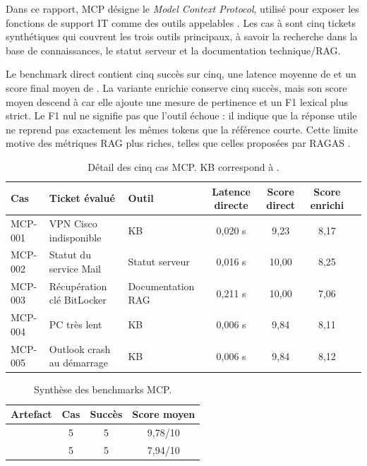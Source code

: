 Dans ce rapport, MCP désigne le \emph{Model Context Protocol}, utilisé pour
exposer les fonctions de support IT comme des outils appelables \cite{mcp2024}.
Les cas
 à  sont cinq
tickets synthétiques qui couvrent les trois outils principaux, à savoir la
recherche dans la base de connaissances, le statut serveur et la documentation
technique/RAG.

Le benchmark direct contient cinq succès sur cinq, une latence moyenne de
 et un score final moyen de . La variante
enrichie conserve cinq succès, mais son score moyen descend à 
car elle ajoute une mesure de pertinence et un F1 lexical plus strict. Le F1 nul
ne signifie pas que l'outil échoue : il indique que la réponse utile ne reprend
pas exactement les mêmes tokens que la référence courte. Cette limite motive des
métriques RAG plus riches, telles que celles proposées par RAGAS
\cite{ragas2023}.


\begin{table}[!htbp]
\centering
\scriptsize
\begin{tabularx}{\textwidth}{lYYcccc}
\toprule
\textbf{Cas} & \textbf{Ticket évalué} & \textbf{Outil} & \textbf{Latence directe} & \textbf{Score direct} & \textbf{Score enrichi}  \\
\midrule
MCP-001 & VPN Cisco indisponible & KB & 0,020 s & 9,23 & 8,17 \\
MCP-002 & Statut du service Mail & Statut serveur & 0,016 s & 10,00 & 8,25  \\
MCP-003 & Récupération clé BitLocker & Documentation RAG & 0,211 s & 10,00 & 7,06 \\
MCP-004 & PC très lent & KB & 0,006 s & 9,84 & 8,11 \\
MCP-005 & Outlook crash au démarrage & KB & 0,006 s & 9,84 & 8,12 \\
\bottomrule
\end{tabularx}
\caption{Détail des cinq cas MCP. KB correspond à .}
\label{tab:mcp-detail}
\end{table}

\begin{table}[!htbp]
\centering
\begin{tabularx}{0.9\textwidth}{Yccc}
\toprule
\textbf{Artefact} & \textbf{Cas} & \textbf{Succès} & \textbf{Score moyen} \\
\midrule
{} & 5 & 5 & 9,78/10 \\
 & 5 & 5 & 7,94/10 \\
\bottomrule
\end{tabularx}
\caption{Synthèse des benchmarks MCP.}
\label{tab:mcp}
\end{table}

